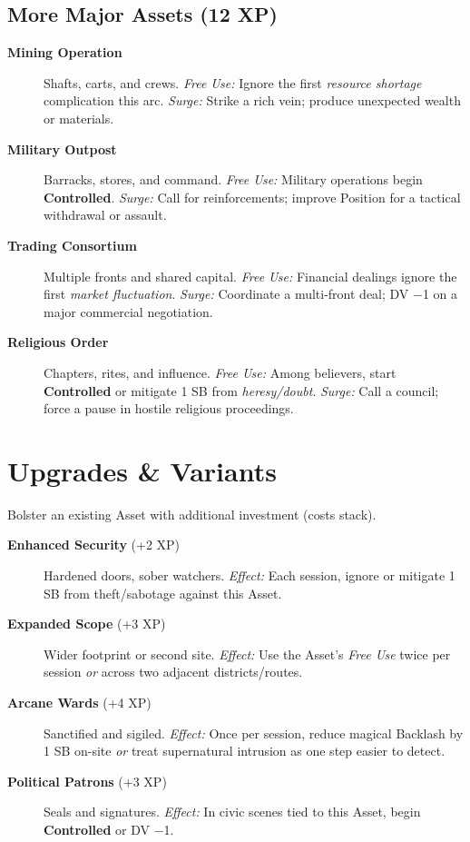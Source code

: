 \subsection*{More Major Assets (12 XP)}
\begin{description}
  \item[\textbf{Mining Operation}]  Shafts, carts, and crews. \emph{Free Use:} Ignore the first \emph{resource shortage} complication this arc. \emph{Surge:} Strike a rich vein; produce unexpected wealth or materials.
  \item[\textbf{Military Outpost}]  Barracks, stores, and command. \emph{Free Use:} Military operations begin \textbf{Controlled}. \emph{Surge:} Call for reinforcements; improve Position for a tactical withdrawal or assault.
  \item[\textbf{Trading Consortium}]  Multiple fronts and shared capital. \emph{Free Use:} Financial dealings ignore the first \emph{market fluctuation}. \emph{Surge:} Coordinate a multi-front deal; DV −1 on a major commercial negotiation.
  \item[\textbf{Religious Order}]  Chapters, rites, and influence. \emph{Free Use:} Among believers, start \textbf{Controlled} or mitigate 1 SB from \emph{heresy/doubt}. \emph{Surge:} Call a council; force a pause in hostile religious proceedings.
\end{description}

\section{Upgrades \& Variants}
Bolster an existing Asset with additional investment (costs stack).
\begin{description}
  \item[\textbf{Enhanced Security} (+2 XP)]  Hardened doors, sober watchers. \emph{Effect:} Each session, ignore or mitigate 1 SB from theft/sabotage against this Asset.
  \item[\textbf{Expanded Scope} (+3 XP)]  Wider footprint or second site. \emph{Effect:} Use the Asset's \emph{Free Use} twice per session \emph{or} across two adjacent districts/routes.
  \item[\textbf{Arcane Wards} (+4 XP)]  Sanctified and sigiled. \emph{Effect:} Once per session, reduce magical Backlash by 1 SB on-site \emph{or} treat supernatural intrusion as one step easier to detect.
  \item[\textbf{Political Patrons} (+3 XP)]  Seals and signatures. \emph{Effect:} In civic scenes tied to this Asset, begin \textbf{Controlled} or DV −1.
\end{description}

